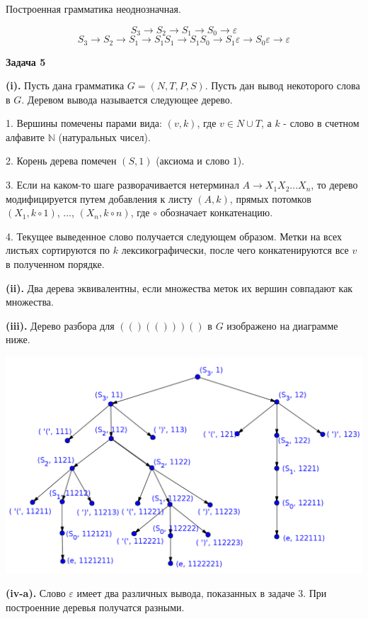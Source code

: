 \documentclass[10pt]{article}
\let \eps \varepsilon
\begin{document}
\smallskip

Построенная грамматика неоднозначная.

$$S_3 \rightarrow S_2 \rightarrow S_1 \rightarrow S_0 \rightarrow \eps$$
$$S_3 \rightarrow S_2 \rightarrow S_1 \rightarrow S_1 S_1 \rightarrow S_1 S_0 \rightarrow S_1 \eps \rightarrow S_0 \eps \rightarrow \eps$$

\medskip

{\bf Задача 5}

{\bf (i).} Пусть дана грамматика $G = (N, T, P, S)$. Пусть дан вывод некоторого слова в $G$. Деревом вывода называется следующее дерево.

1. Вершины помечены парами вида: $(v, k)$, где $v \in N \cup T$, а $k$ - слово в счетном алфавите $\mathbb{N}$ (натуральных чисел).

2. Корень дерева помечен $(S, 1)$ (аксиома и слово $1$).

3. Если на каком-то шаге разворачивается нетерминал $A \rightarrow X_1 X_2 ... X_n$, то дерево модифицируется путем добавления к листу $(A, k)$, прямых потомков $(X_1, k \circ 1)$, ..., $(X_n, k \circ n)$, где $\circ$ обозначает конкатенацию.

4. Текущее выведенное слово получается следующем образом. Метки на всех листьях сортируются по $k$ лексикографически, после чего конкатенируются все $v$ в полученном порядке.

\smallskip

{\bf (ii).} Два дерева эквивалентны, если множества меток их вершин совпадают как множества.

\smallskip

{\bf (iii).} Дерево разбора для $(()(()))()$ в $G$ изображено на диаграмме ниже.

\centerline{\includegraphics[width = \textwidth]{tree-1.png}}

\smallskip

{\bf (iv-a).} Слово $\eps$ имеет два различных вывода, показанных в задаче 3. При построенние деревья получатся разными. 
\end{document}

